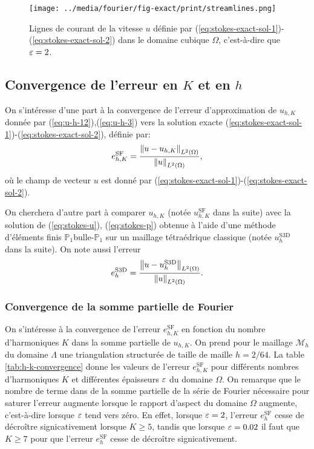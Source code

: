 \begin{figure}[t]
  \begin{center}
    \texttt{[image: ../media/fourier/fig-exact/print/streamlines.png]}
    \caption{Lignes de courant de la vitesse $u$ définie par
      (\ref{eq:stokes-exact-sol-1})-(\ref{eq:stokes-exact-sol-2}) dans
      le domaine cubique $\Omega$, c'est-à-dire que $\varepsilon = 2$.}
    \label{fig:stokes-exact-sol-streamlines}
  \end{center}
\end{figure}


\subsection{Convergence de l'erreur en $K$ et en $h$}
On s'intéresse d'une part à la convergence de l'erreur d'approximation
de $u_{h,K}$ donnée par (\ref{eq:u-h-12}),(\ref{eq:u-h-3}) vers la
solution exacte
(\ref{eq:stokes-exact-sol-1})-(\ref{eq:stokes-exact-sol-2}), définie
par:
\begin{equation}
  e_{h,K}^{\mathrm{SF}} =
  \frac{\left\lVert u - u_{h,K} \right\rVert_{L^2(\Omega)}}{\left\lVert u \right\rVert_{L^2(\Omega)}},
\end{equation}
où le champ de vecteur $u$ est donné par
(\ref{eq:stokes-exact-sol-1})-(\ref{eq:stokes-exact-sol-2}).

On cherchera d'autre part à comparer $u_{h,K}$ (notée
$u_{h,K}^{\mathrm{SF}}$ dans la suite) avec la solution de
(\ref{eq:stokes-u}), (\ref{eq:stokes-p}) obtenue à l'aide d'une
méthode d'éléments finis $\mathbb P_1$bulle-$\mathbb P_1$ sur un
maillage tétraédrique classique (notée
$u_h^\mathrm{S3D}$ dans la suite). On note aussi l'erreur
\begin{equation}
  e_h^{\mathrm{S3D}} = \frac{\left\lVert u - u_h^{\mathrm{S3D}} \right\rVert_{L^2(\Omega)}}{\left\lVert u \right\rVert_{L^2(\Omega)}}.
\end{equation}

\renewcommand{\floatpagefraction}{.9}%
\renewcommand{\topfraction}{.9}
\setcounter{topnumber}{3}
\setcounter{totalnumber}{4}

\subsubsection{Convergence de la somme partielle de Fourier}
On s'intéresse à la convergence de l'erreur $e_{h,K}^\mathrm{SF}$ en
fonction du nombre d'harmoniques $K$ dans la somme partielle de
$u_{h,K}$. On prend pour le maillage $\mathcal M_h$ du domaine $\Lambda$
une triangulation structurée de taille de maille $h = 2/64$. La
table \ref{tab:h-k-convergence} donne les valeurs de l'erreur
$e_{h,K}^\mathrm{SF}$ pour différents nombres d'harmoniques $K$ et
différentes épaisseurs $\varepsilon$ du domaine $\Omega$. On remarque
que le nombre de terme dans de la somme partielle de la série de
Fourier nécessaire pour saturer l'erreur augmente lorsque le rapport
d'aspect du domaine $\Omega$ augmente, c'est-à-dire lorsque
$\varepsilon$ tend vers zéro. En effet, lorsque $\varepsilon = 2$,
l'erreur $e_h^\mathrm{SF}$ cesse de décroître signicativement lorsque $K \geq 5$,
tandis que lorsque $\varepsilon = 0.02$ il faut que $K \geq 7$ pour que
l'erreur $e_h^\mathrm{SF}$ cesse de décroître signicativement.


